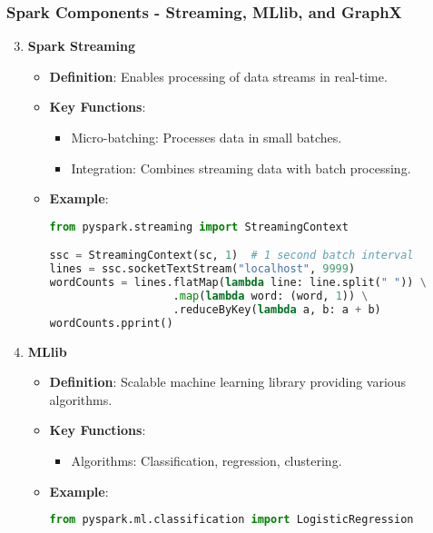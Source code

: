 \documentclass{beamer}
\begin{document}
\begin{frame}[fragile]
    \frametitle{Spark Components - Streaming, MLlib, and GraphX}
    \begin{enumerate}
        \setcounter{enumi}{2}
        \item \textbf{Spark Streaming}
            \begin{itemize}
                \item \textbf{Definition}: Enables processing of data streams in real-time.
                \item \textbf{Key Functions}:
                    \begin{itemize}
                        \item Micro-batching: Processes data in small batches.
                        \item Integration: Combines streaming data with batch processing.
                    \end{itemize}
                \item \textbf{Example}:
                \begin{lstlisting}[language=Python]
from pyspark.streaming import StreamingContext

ssc = StreamingContext(sc, 1)  # 1 second batch interval
lines = ssc.socketTextStream("localhost", 9999)
wordCounts = lines.flatMap(lambda line: line.split(" ")) \
                   .map(lambda word: (word, 1)) \
                   .reduceByKey(lambda a, b: a + b)
wordCounts.pprint()
                \end{lstlisting}
            \end{itemize}
          
        \item \textbf{MLlib}
            \begin{itemize}
                \item \textbf{Definition}: Scalable machine learning library providing various algorithms.
                \item \textbf{Key Functions}:
                    \begin{itemize}
                        \item Algorithms: Classification, regression, clustering.
                    \end{itemize}
                \item \textbf{Example}:
                \begin{lstlisting}[language=Python]
from pyspark.ml.classification import LogisticRegression


\end{lstlisting}
\end{itemize}
\end{enumerate}
\end{frame}
\end{document}
